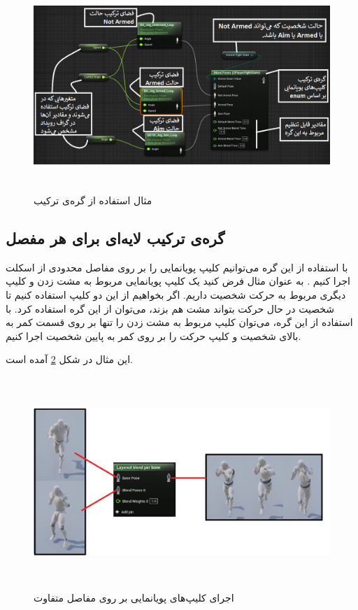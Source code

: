 \begin{figure}[ht]
	\centerline{\includegraphics[width=\textwidth,height=8cm,keepaspectratio]{Figures/Ch3/EnumBlendNode_WithArrow.png}}\hfill
	\caption{ مثال استفاده از گره‌ی ترکیب }
	\label{fig:EnumBlendNode_WithArrow}
\end{figure}

\subsection{ گره‌ی ترکیب لایه‌ای برای هر مفصل}

با استفاده از این گره‌ می‌توانیم کلیپ‌ پویانمایی را بر روی 
مفاصل محدودی از اسکلت اجرا کنیم \cite{BlendNodeUnrealEngine}.
به عنوان مثال فرض کنید یک کلیپ پویانمایی مربوط به مشت زدن و کلیپ 
دیگری مربوط به حرکت شخصیت داریم. 
اگر بخواهیم از این دو کلیپ استفاده کنیم تا شخصیت در حال 
حرکت بتواند مشت هم بزند، می‌توان از این گره استفاده کرد.
با استفاده از این گره، می‌توان کلیپ مربوط به مشت زدن را تنها 
بر روی قسمت کمر به بالا‌‌‌ی شخصیت و کلیپ حرکت را بر 
روی کمر به پایین شخصیت اجرا کنیم.

این مثال در شکل 
\ref{fig:LayeredBlendPerBone_WithArrow}
آمده است.

\begin{figure}[ht]
	\centerline{\includegraphics[width=\textwidth,height=8cm,keepaspectratio]{Figures/Ch3/LayeredBlendPerBone_WithArrow.png}}\hfill
	\caption{ اجرای کلیپ‌‌‌های پویانمایی بر روی مفاصل متفاوت }
	\label{fig:LayeredBlendPerBone_WithArrow}
\end{figure}




